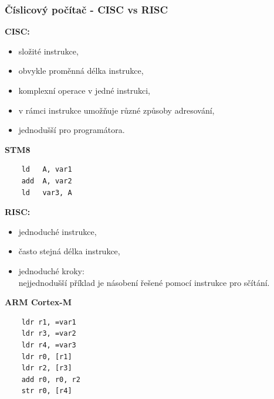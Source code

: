 	\begin{frame}[fragile]
    \frametitle{Číslicový počítač - CISC vs RISC}
		
		\begin{minipage}[t][\textheight][t]{0.48\textwidth}
		\textbf{CISC:}
		
		\begin{itemize}
			\item složité instrukce,
			\item obvykle proměnná délka instrukce,
			\item komplexní operace v jedné instrukci,
			\item v rámci instrukce umožňuje různé způsoby adresování,
			\item jednodušší pro programátora.
		\end{itemize}
		
		\vspace{2mm}
		\textbf{STM8}
		\footnotesize
		\begin{lstlisting}
	ld   A, var1
	add  A, var2
	ld   var3, A
		\end{lstlisting}
		
		\end{minipage}
		\begin{minipage}[t][\textheight][t]{0.48\textwidth}
		\textbf{RISC:}
		\begin{itemize}
			\item jednoduché instrukce,
			\item často stejná délka instrukce,
			\item jednoduché kroky:\\
			nejjednodušší příklad je násobení řešené pomocí instrukce pro sčítání. 
		\end{itemize}
		
		\vspace{2mm}
		\textbf{ARM Cortex-M}
		\footnotesize
		\begin{lstlisting}
	ldr r1, =var1
	ldr r3, =var2
	ldr r4, =var3
	ldr r0, [r1]
	ldr r2, [r3]
	add r0, r0, r2
	str r0, [r4]
		\end{lstlisting}
		\end{minipage}

	\end{frame}